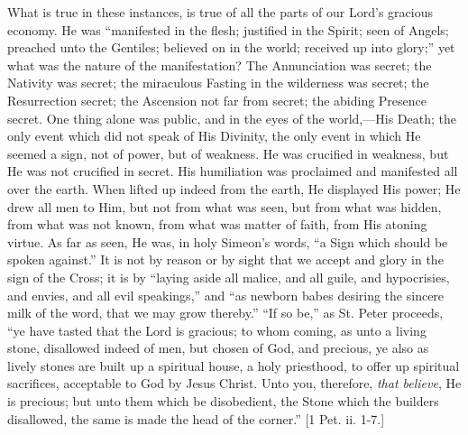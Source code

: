 What is true in these instances, is true of all the parts of our
Lord's gracious economy. He was ``manifested in the flesh; justified
in the Spirit; seen of Angels; preached unto the Gentiles; believed on
in the world; received up into glory;'' yet what was the nature of
the manifestation? The Annunciation was secret; the Nativity was secret;
the miraculous Fasting in the wilderness was secret; the Resurrection
secret; the Ascension not far from secret; the abiding Presence secret.
One thing alone was public, and in the eyes of the world,—His Death;
the only event which did not speak of His Divinity, the only event in
which He seemed a sign, not of power, but of weakness. He was crucified
in weakness, but He was not crucified in secret. His humiliation was
proclaimed and manifested all over the earth. When lifted up indeed from
the earth, He displayed His power; He drew all men to Him, but not from
what was seen, but from what was hidden, from what was not known, from
what was matter of faith, from His atoning virtue. As far as seen, He
was, in holy Simeon's words, ``a Sign which should be spoken
against.'' It is not by reason or by sight that we accept and glory
in the sign of the Cross; it is by ``laying aside all malice, and
all guile, and hypocrisies, and envies, and all evil speakings,''
and ``as newborn babes desiring the sincere milk of the word, that we may
grow thereby.'' ``If so be,'' as St. Peter proceeds,
``ye have tasted that the Lord is gracious; to whom coming, as unto
a living stone, disallowed indeed of men, but chosen of God, and
precious, ye also as lively stones are built up a spiritual house, a
holy priesthood, to offer up spiritual sacrifices, acceptable to God by
Jesus Christ. Unto you, therefore, \emph{that believe}, He is precious;
but unto them which be disobedient, the Stone which the builders
disallowed, the same is made the head of the corner.'' [1 Pet. ii.
1-7.]

